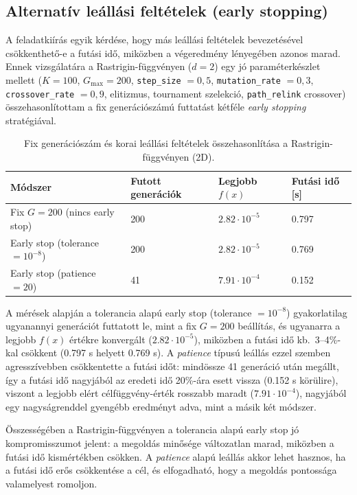 \documentclass[a4paper,12pt]{article}
\begin{document}
\subsection{Alternatív leállási feltételek (early stopping)}

A feladatkiírás egyik kérdése, hogy más leállási feltételek bevezetésével
csökkenthető-e a futási idő, miközben a végeredmény lényegében azonos marad.
Ennek vizsgálatára a Rastrigin-függvényen ($d=2$) egy jó paraméterkészlet
mellett (\(K=100\), \(G_{\max}=200\), \texttt{step\_size} $=0{,}5$,
\texttt{mutation\_rate} $=0{,}3$, \texttt{crossover\_rate} $=0{,}9$,
elitizmus, tournament szelekció, \texttt{path\_relink} crossover)
összehasonlítottam a fix generációszámú futtatást kétféle
\emph{early stopping} stratégiával.

\begin{table}[H]
  \centering
  \begin{tabular}{llll}
    \toprule
    Módszer & Futott generációk & Legjobb $f(x)$ & Futási idő [s] \\
    \midrule
    Fix $G=200$ (nincs early stop) 
      & 200 
      & $2.82\cdot 10^{-5}$ 
      & 0.797 \\
    Early stop (tolerance $=10^{-8}$) 
      & 200 
      & $2.82\cdot 10^{-5}$ 
      & 0.769 \\
    Early stop (patience $=20$) 
      & 41 
      & $7.91\cdot 10^{-4}$ 
      & 0.152 \\
    \bottomrule
  \end{tabular}
  \caption{Fix generációszám és korai leállási feltételek összehasonlítása
           a Rastrigin-függvényen (2D).}
  \label{tab:early-stop}
\end{table}

A mérések alapján a tolerancia alapú early stop (tolerance $=10^{-8}$)
gyakorlatilag ugyanannyi generációt futtatott le, mint a fix $G=200$
beállítás, és ugyanarra a legjobb $f(x)$ értékre konvergált
($2.82\cdot 10^{-5}$), miközben a futási idő kb.\ 3--4\%-kal csökkent
(0.797 s helyett 0.769 s). A \emph{patience} típusú leállás ezzel
szemben agresszívebben csökkentette a futási időt: mindössze
41 generáció után megállt, így a futási idő nagyjából az
eredeti idő 20\%-ára esett vissza (0.152 s körülire), viszont a legjobb
elért célfüggvény-érték rosszabb maradt ($7.91\cdot 10^{-4}$),
nagyjából egy nagyságrenddel gyengébb eredményt adva, mint a másik két módszer.

Összességében a Rastrigin-függvényen a tolerancia alapú early stop
jó kompromisszumot jelent: a megoldás minősége változatlan marad,
miközben a futási idő kismértékben csökken. A \emph{patience} alapú
leállás akkor lehet hasznos, ha a futási idő erős csökkentése a cél,
és elfogadható, hogy a megoldás pontossága valamelyest romoljon.
\end{document}

